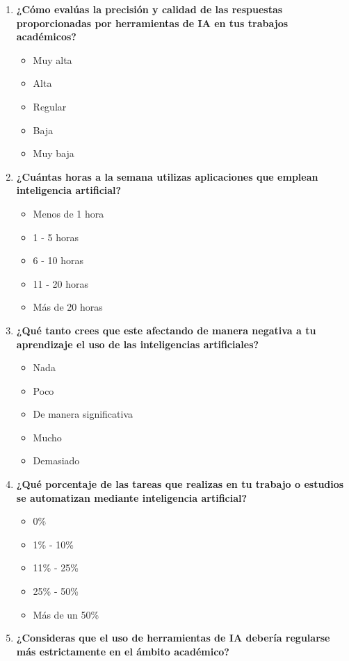 \documentclass{article}
\newenvironment{recoleccionDeInformacion}{}{}
\begin{document}
\begin{recoleccionDeInformacion}
\begin{multicols}{2}
\begin{enumerate}
\begin{itemize}
      \end{itemize}
      \item \textbf{¿Cómo evalúas la precisión y calidad de las respuestas proporcionadas por herramientas de IA en tus trabajos académicos?}
      \begin{itemize}
        \item Muy alta
        \item Alta
        \item Regular
        \item Baja
        \item Muy baja
      \end{itemize}
      \item \textbf{¿Cuántas horas a la semana utilizas aplicaciones que emplean inteligencia artificial?}
      \begin{itemize}
        \item Menos de 1 hora
        \item 1 - 5 horas
        \item 6 - 10 horas
        \item 11 - 20 horas
        \item Más de 20 horas
      \end{itemize}
      \item \textbf{¿Qué tanto crees que este afectando de manera negativa a tu aprendizaje el uso de las inteligencias artificiales?}
      \begin{itemize}
        \item Nada
        \item Poco
        \item De manera significativa
        \item Mucho
        \item Demasiado
      \end{itemize}
      \item \textbf{¿Qué porcentaje de las tareas que realizas en tu trabajo  o estudios se automatizan mediante inteligencia artificial?}
      \begin{itemize}
        \item 0\%
        \item 1\% - 10\%
        \item 11\% - 25\%
        \item 25\% - 50\%
        \item Más de un 50\%
      \end{itemize}
      \item \textbf{¿Consideras que el uso de herramientas de IA debería regularse más estrictamente en el ámbito académico?}

\end{enumerate}
\end{multicols}
\end{recoleccionDeInformacion}
\end{document}
